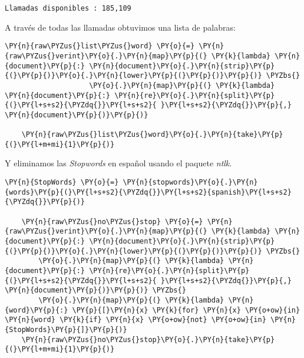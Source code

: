     \begin{Verbatim}[commandchars=\\\{\}]
Llamadas disponibles : 185,109
    \end{Verbatim}
    
    
 A través de todas las llamadas obtuvimos una lista de palabras: 
    \vspace{0.5cm}
    
        \begin{tcolorbox}[breakable, size=fbox, boxrule=1pt, pad at break*=1mm,colback=cellbackground, colframe=cellborder]
    \begin{Verbatim}[commandchars=\\\{\}]
    \PY{n}{raw\PYZus{}list\PYZus{}word} \PY{o}{=} \PY{n}{raw\PYZus{}verint}\PY{o}{.}\PY{n}{map}\PY{p}{(} \PY{k}{lambda} \PY{n}{document}\PY{p}{:} \PY{n}{document}\PY{o}{.}\PY{n}{strip}\PY{p}{(}\PY{p}{)}\PY{o}{.}\PY{n}{lower}\PY{p}{(}\PY{p}{)}\PY{p}{)} \PYZbs{}
                    \PY{o}{.}\PY{n}{map}\PY{p}{(} \PY{k}{lambda} \PY{n}{document}\PY{p}{:} \PY{n}{re}\PY{o}{.}\PY{n}{split}\PY{p}{(}\PY{l+s+s2}{\PYZdq{}}\PY{l+s+s2}{ }\PY{l+s+s2}{\PYZdq{}}\PY{p}{,} \PY{n}{document}\PY{p}{)}\PY{p}{)}
    
    \PY{n}{raw\PYZus{}list\PYZus{}word}\PY{o}{.}\PY{n}{take}\PY{p}{(}\PY{l+m+mi}{1}\PY{p}{)}
    \end{Verbatim}
    \end{tcolorbox}
    
    
    
Y eliminamos las \textit{Stopwords} en español usando el paquete \textit{ntlk}.

\vspace{0.5cm}
    
        \begin{tcolorbox}[breakable, size=fbox, boxrule=1pt, pad at break*=1mm,colback=cellbackground, colframe=cellborder]
    \begin{Verbatim}[commandchars=\\\{\}]
    \PY{n}{StopWords} \PY{o}{=} \PY{n}{stopwords}\PY{o}{.}\PY{n}{words}\PY{p}{(}\PY{l+s+s2}{\PYZdq{}}\PY{l+s+s2}{spanish}\PY{l+s+s2}{\PYZdq{}}\PY{p}{)}
    
    \PY{n}{raw\PYZus{}no\PYZus{}stop} \PY{o}{=} \PY{n}{raw\PYZus{}verint}\PY{o}{.}\PY{n}{map}\PY{p}{(} \PY{k}{lambda} \PY{n}{document}\PY{p}{:} \PY{n}{document}\PY{o}{.}\PY{n}{strip}\PY{p}{(}\PY{p}{)}\PY{o}{.}\PY{n}{lower}\PY{p}{(}\PY{p}{)}\PY{p}{)} \PYZbs{}
    	\PY{o}{.}\PY{n}{map}\PY{p}{(} \PY{k}{lambda} \PY{n}{document}\PY{p}{:} \PY{n}{re}\PY{o}{.}\PY{n}{split}\PY{p}{(}\PY{l+s+s2}{\PYZdq{}}\PY{l+s+s2}{ }\PY{l+s+s2}{\PYZdq{}}\PY{p}{,} \PY{n}{document}\PY{p}{)}\PY{p}{)} \PYZbs{}
        \PY{o}{.}\PY{n}{map}\PY{p}{(} \PY{k}{lambda} \PY{n}{word}\PY{p}{:} \PY{p}{[}\PY{n}{x} \PY{k}{for} \PY{n}{x} \PY{o+ow}{in} \PY{n}{word} \PY{k}{if} \PY{n}{x} \PY{o+ow}{not} \PY{o+ow}{in} \PY{n}{StopWords}\PY{p}{]}\PY{p}{)}
    \PY{n}{raw\PYZus{}no\PYZus{}stop}\PY{o}{.}\PY{n}{take}\PY{p}{(}\PY{l+m+mi}{1}\PY{p}{)}
    \end{Verbatim}
    \end{tcolorbox}
    

